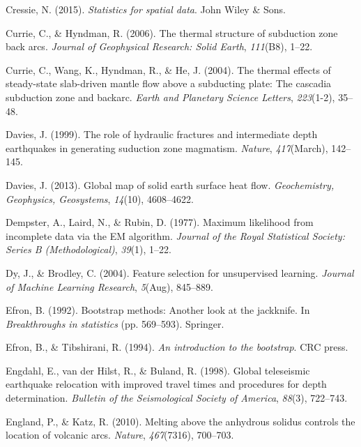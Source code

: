 \begin{CSLReferences}{1}{1}
\leavevmode{}%
Cressie, N. (2015). \emph{Statistics for spatial data}. John Wiley \& Sons.

\leavevmode{}%
Currie, C., \& Hyndman, R. (2006). The thermal structure of subduction zone back arcs. \emph{Journal of Geophysical Research: Solid Earth}, \emph{111}(B8), 1--22.

\leavevmode{}%
Currie, C., Wang, K., Hyndman, R., \& He, J. (2004). The thermal effects of steady-state slab-driven mantle flow above a subducting plate: The cascadia subduction zone and backarc. \emph{Earth and Planetary Science Letters}, \emph{223}(1-2), 35--48.

\leavevmode{}%
Davies, J. (1999). The role of hydraulic fractures and intermediate depth earthquakes in generating suduction zone magmatism. \emph{Nature}, \emph{417}(March), 142--145.

\leavevmode{}%
Davies, J. (2013). Global map of solid earth surface heat flow. \emph{Geochemistry, Geophysics, Geosystems}, \emph{14}(10), 4608--4622.

\leavevmode{}%
Dempster, A., Laird, N., \& Rubin, D. (1977). Maximum likelihood from incomplete data via the EM algorithm. \emph{Journal of the Royal Statistical Society: Series B (Methodological)}, \emph{39}(1), 1--22.

\leavevmode{}%
Dy, J., \& Brodley, C. (2004). Feature selection for unsupervised learning. \emph{Journal of Machine Learning Research}, \emph{5}(Aug), 845--889.

\leavevmode{}%
Efron, B. (1992). Bootstrap methods: Another look at the jackknife. In \emph{Breakthroughs in statistics} (pp. 569--593). Springer.

\leavevmode{}%
Efron, B., \& Tibshirani, R. (1994). \emph{An introduction to the bootstrap}. CRC press.

\leavevmode{}%
Engdahl, E., van der Hilst, R., \& Buland, R. (1998). Global teleseismic earthquake relocation with improved travel times and procedures for depth determination. \emph{Bulletin of the Seismological Society of America}, \emph{88}(3), 722--743.

\leavevmode{}%
England, P., \& Katz, R. (2010). Melting above the anhydrous solidus controls the location of volcanic arcs. \emph{Nature}, \emph{467}(7316), 700--703.


\end{CSLReferences}
